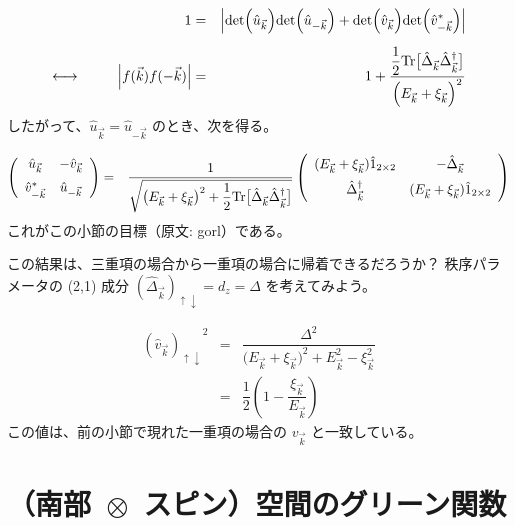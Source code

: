\documentclass[uplatex,a4j,12pt,dvipdfmx]{jsarticle}
\begin{document}
\begin{eqnarray}
	1
	&=&
	\Big|
	{\rm det} \Big( \hat{u}_{\vec{k}} \Big) {\rm det} \Big( \hat{u}_{- \vec{k}} \Big)
	+
	{\rm det} \Big( \hat{v}_{\vec{k}} \Big) {\rm det} \Big( \hat{v}_{- \vec{k}}^{*} \Big)
	\Big|
	\nonumber \\[2mm] \longleftrightarrow \hspace{9mm}
	\Big| f(\vec{k})f(-\vec{k}) \Big|
	&=&
	1
	+
	\dfrac{
		\dfrac{1}{2} {\rm Tr} \big[ \hat{\Delta}_{\vec{k}} \hat{\Delta}^{\dagger}_{\vec{k}} \big]
	}
	{
		\Big( E_{\vec{k}} + \xi_{\vec{k}} \Big)^{2}
	}
\end{eqnarray}
%
したがって、$\hat{u}_{\vec{k}} = \hat{u}_{ - \vec{k} }$ のとき、次を得る。

\begin{eqnarray}
	\left(
	\begin{array}{cc}
			\hat{u}_{\vec{k}}       & - \hat{v}_{\vec{k}} \\[2mm]
			\hat{v}_{- \vec{k}}^{*} & \hat{u}_{-\vec{k}}
		\end{array}
	\right)
	&=&
	\dfrac{ 1 }{ \sqrt{ \big( E_{\vec{k}} + \xi_{\vec{k}} \big)^{2} + \dfrac{1}{2} {\rm Tr} \big[ \hat{\Delta}_{\vec{k}} \hat{\Delta}^{\dagger}_{\vec{k}} \big] } }
	\left(
	\begin{array}{cc}
			( E_{\vec{k}} + \xi_{\vec{k}} ) \hat{1}_{2 \times 2} & - \hat{\Delta}_{\vec{k}}                             \\[2mm]
			\hat{\Delta}_{\vec{k}}^{\dagger}                     & ( E_{\vec{k}} + \xi_{\vec{k}} ) \hat{1}_{2 \times 2}
		\end{array}
	\right)
\end{eqnarray}
%
これがこの小節の目標（原文: gorl）である。

この結果は、三重項の場合から一重項の場合に帰着できるだろうか？
秩序パラメータの (2,1) 成分 $(\hat{\Delta}_{\vec{k}})_{\uparrow \downarrow} = d_{z} = \Delta$ を考えてみよう。

\begin{eqnarray}
	{(\hat{v}_{\vec{k}})_{\uparrow \downarrow}}^{2}
	&=&
	\dfrac{ \Delta^{2} }{ \big( E_{\vec{k}} + \xi_{\vec{k}} \big)^{2} + E_{\vec{k}}^{2} - \xi_{\vec{k}}^{2} }
	\nonumber \\[2mm] &=&
	\dfrac{1}{2}
	\left( 1 - \dfrac{\xi_{\vec{k}}}{E_{\vec{k}}} \right)
\end{eqnarray}
%
この値は、前の小節で現れた一重項の場合の $v_{\vec{k}}$ と一致している。

\section{（南部 $\!\! \otimes \!\!$ スピン）空間のグリーン関数}
\end{document}
